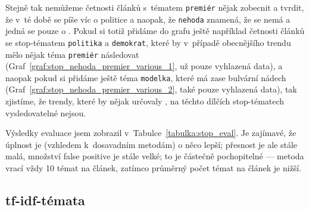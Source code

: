 \documentclass[12pt,a4paper]{report}
\begin{document}
Stejně tak nemůžeme četnosti článků s~tématem \texttt{premiér} nějak zobecnit a tvrdit, že v~té době se píše víc o politice a naopak, že \texttt{nehoda} znamená, že se nemá  a jedná se pouze o . Pokud si totiž přidáme do grafu ještě například četnosti článků se stop-tématem \texttt{politika} a \texttt{demokrat}, které by v~případě obecnějšího trendu mělo nějak téma \texttt{premiér} následovat (Graf~\ref{graf:stop_nehoda_premier_various_1}, už pouze vyhlazená data), a naopak pokud si přidáme ještě téma \texttt{modelka}, které má zase bulvární nádech (Graf~\ref{graf:stop_nehoda_premier_various_2}, také pouze vyhlazená data), tak zjistíme, že trendy, které by nějak určovaly , na těchto dílčích stop-tématech vysledovatelné nejsou. 



Výsledky evaluace jsem zobrazil v~Tabulce~\ref{tabulka:stop_eval}. Je zajímavé, že úplnost je (vzhledem k~dosavadním metodám) o něco lepší; přesnost je ale stále malá, množství false positive je stále velké; to je částečně pochopitelné --- metoda vrací vždy 10 témat na článek, zatímco průměrný počet témat na článek je nižší.

\subsection{tf-idf-témata}
\end{document}
